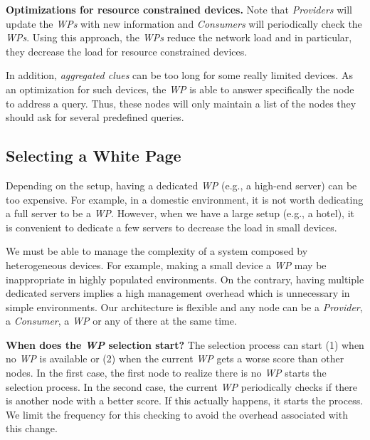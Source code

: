 \noindent\textbf{Optimizations for resource constrained devices.}
Note that \emph{Providers} will update the \emph{WPs} with new information and \emph{Consumers} will periodically check the \emph{WPs}.
Using this approach, the \emph{WPs} reduce the network load and in particular, they decrease the load for resource constrained devices.

In addition, \emph{aggregated clues} can be too long for some really limited devices.
As an optimization for such devices, the \emph{WP} is able to answer specifically the node to address a query.
Thus, these nodes will only maintain a list of the nodes they should ask for several predefined queries.



\subsection{Selecting a White Page}
\label{sec:selection}
Depending on the setup, having a dedicated \emph{WP} (e.g., a high-end server) can be too expensive.
For example, in a domestic environment, it is not worth dedicating a full server to be a \emph{WP}.
However, when we have a large setup (e.g., a hotel), it is convenient to dedicate a few servers to decrease the load in small devices.

We must be able to manage the complexity of a system composed by heterogeneous devices.
For example, making a small device a \emph{WP} may be inappropriate in highly populated environments.
On the contrary, having multiple dedicated servers implies a high management overhead which is unnecessary in simple environments.
Our architecture is flexible and any node can be a \emph{Provider}, a \emph{Consumer}, a \emph{WP} or any of there at the same time.

\noindent\textbf{When does the \emph{WP} selection start?}
The selection process can start (1) when no \emph{WP} is available or (2) when the current \emph{WP} gets a worse score than other nodes.
In the first case, the first node to realize there is no \emph{WP} starts the selection process.
In the second case, the current \emph{WP} periodically checks if there is another node with a better score.
If this actually happens, it starts the process.
We limit the frequency for this checking to avoid the overhead associated with this change.


